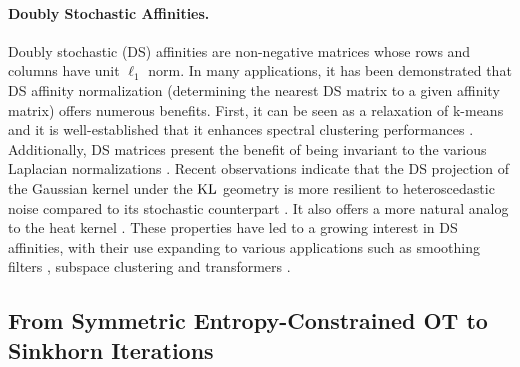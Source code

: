 \paragraph{Doubly Stochastic Affinities.}
Doubly stochastic (DS) affinities are non-negative matrices whose rows and columns have unit $\ell_1$ norm. 
In many applications, it has been demonstrated that DS affinity normalization (\ie determining the nearest DS matrix to a given affinity matrix) offers numerous benefits. First, it can be seen as a relaxation of k-means \citep{zass2005unifying} and it is well-established that it enhances spectral clustering performances \citep{Ding_understand,Zass,beauchemin2015affinity}. Additionally, DS matrices present the benefit of being invariant to the various Laplacian normalizations \citep{von2007tutorial}. Recent observations indicate that the DS projection of the Gaussian kernel under the $\operatorname{KL}$ geometry is more resilient to heteroscedastic noise compared to its stochastic counterpart \citep{landa2021doubly}. It also offers a more natural analog to the heat kernel \citep{marshall2019manifold}.
These properties have led to a growing interest in DS affinities, with their use expanding to various applications such as smoothing filters \citep{Milanfar}, subspace clustering \citep{lim2020doubly} and transformers \citep{sander2022sinkformers}.

\subsection{From Symmetric Entropy-Constrained OT to Sinkhorn Iterations}\label{sec:proof_sinkhorn}

